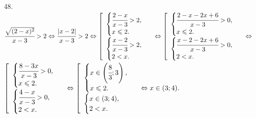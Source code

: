 48. $\cfrac{\sqrt{(2-x)^2}}{x-3}>2\Leftrightarrow\cfrac{|x-2|}{x-3}>2\Leftrightarrow\left[\begin{array}{l} \begin{cases} \cfrac{2-x}{x-3}>2,\\
x\leqslant2.\end{cases}\\ \begin{cases} \cfrac{x-2}{x-3}>2,\\ 2<x.\end{cases}\end{array}\right.\Leftrightarrow\left[\begin{array}{l} \begin{cases} \cfrac{2-x-2x+6}{x-3}>0,\\ x\leqslant2.\end{cases}\\ \begin{cases} \cfrac{x-2-2x+6}{x-3}>0,\\ 2<x.\end{cases}\end{array}\right.\Leftrightarrow$\\$\left[\begin{array}{l} \begin{cases} \cfrac{8-3x}{x-3}>0,\\ x\leqslant2.\end{cases}\\ \begin{cases} \cfrac{4-x}{x-3}>0,\\ 2<x.\end{cases}\end{array}\right.\Leftrightarrow\left[\begin{array}{l} \begin{cases} x\in\left(\cfrac{8}{3};3\right),\\ x\leqslant2.\end{cases}\\ \begin{cases} x\in(3;4),\\ 2<x.\end{cases}\end{array}\right.\Leftrightarrow x\in (3;4).$\\
